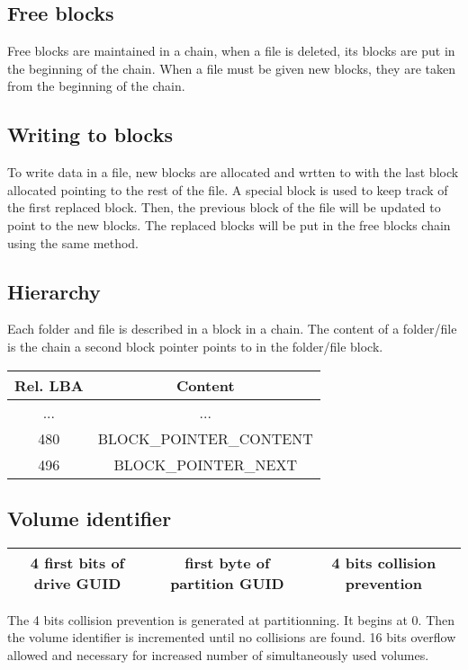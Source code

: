 \documentclass{article}
\begin{document}
\subsection{Free blocks}
Free blocks are maintained in a chain, when a file is deleted, its blocks are put in the beginning of the chain. When a file must be given new blocks, they are taken from the beginning of the chain.
\subsection{Writing to blocks} 
To write data in a file, new blocks are allocated and wrtten to with the last block allocated pointing to the rest of the file. A special block is used to keep track of the first replaced block.
Then, the previous block of the file will be updated to point to the new blocks.
The replaced blocks will be put in the free blocks chain using the same method.

\subsection{Hierarchy}
Each folder and file is described in a block in a chain. The content of a folder/file is the chain a second block pointer points to in the folder/file block.
\newline
\begin{tabular}{|c|c|}
  \hline
  Rel. LBA & Content \\
  \hline
  ... & ...  \\
  \hline
  480 & BLOCK\_POINTER\_CONTENT \\
  \hline
  496 & BLOCK\_POINTER\_NEXT \\
  \hline
\end{tabular}

\subsection{Volume identifier}

\begin{tabular}{|c|c|c|}
  \hline
  4 first bits of drive GUID & first byte of partition GUID & 4 bits collision prevention \\
  \hline
\end{tabular}
\newline
The 4 bits collision prevention is generated at partitionning. It begins at 0. Then the volume identifier is incremented until no collisions are found. 16 bits overflow allowed and necessary for increased number of simultaneously used volumes.
\end{document}
